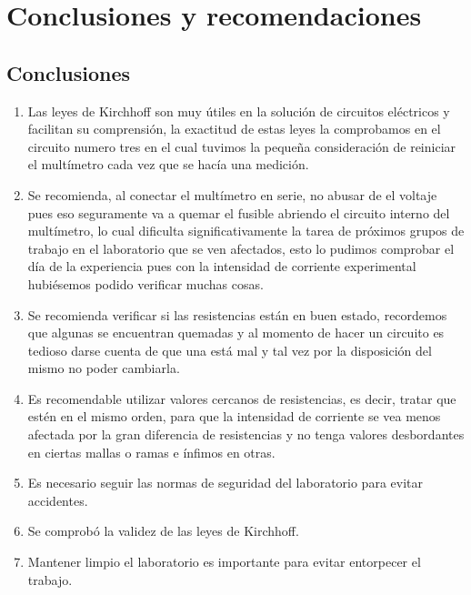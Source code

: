 \documentclass[a4paper,12pt]{report}
\begin{document}
\part{Conclusiones y recomendaciones}
\chapter{Conclusiones}
\begin{enumerate}
\item Las leyes de Kirchhoff son muy útiles en la solución de circuitos eléctricos y facilitan su comprensión, la exactitud de estas leyes la comprobamos en el circuito numero tres en el cual tuvimos la pequeña consideración de reiniciar el multímetro cada vez que se hacía una medición.
\item Se recomienda, al conectar el multímetro en serie, no abusar de el voltaje pues eso seguramente va a quemar el fusible abriendo el circuito interno del multímetro, lo cual dificulta significativamente la tarea de próximos grupos de trabajo en el laboratorio que se ven afectados, esto lo pudimos comprobar el día de la experiencia pues con la intensidad de corriente experimental hubiésemos podido verificar muchas cosas.
\item Se recomienda verificar si las resistencias están en buen estado, recordemos que algunas se encuentran quemadas y al momento de hacer un circuito es tedioso darse cuenta de que una está mal y tal vez por la disposición del mismo no poder cambiarla.
\item Es recomendable utilizar valores cercanos de resistencias, es decir, tratar que estén en el mismo orden, para que la intensidad de corriente se vea menos afectada por la gran diferencia de resistencias y no tenga valores desbordantes en ciertas mallas o ramas e ínfimos en otras. 
\item Es necesario seguir las normas de seguridad del laboratorio para evitar accidentes.
\item Se comprobó la validez de las leyes de Kirchhoff.
\item Mantener limpio el laboratorio es importante para evitar entorpecer el trabajo.
\end{enumerate}
\end{document}
